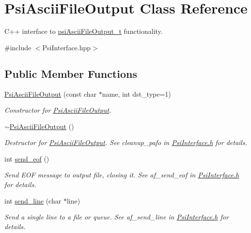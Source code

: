 \hypertarget{classPsiAsciiFileOutput}{}\section{Psi\+Ascii\+File\+Output Class Reference}
\label{classPsiAsciiFileOutput}


C++ interface to \hyperlink{structpsiAsciiFileOutput__t}{psi\+Ascii\+File\+Output\+\_\+t} functionality.  




{\ttfamily \#include $<$Psi\+Interface.\+hpp$>$}

\subsection*{Public Member Functions}
\begin{DoxyCompactItemize}
\item 
\hyperlink{classPsiAsciiFileOutput_a08f5ec347f018509dcdd6b7405e15e36}{Psi\+Ascii\+File\+Output} (const char $\ast$name, int dst\+\_\+type=1)
\begin{DoxyCompactList}\small\item\em Constructor for \hyperlink{classPsiAsciiFileOutput}{Psi\+Ascii\+File\+Output}. \end{DoxyCompactList}\item 
\mbox{\label{classPsiAsciiFileOutput_a616fa02af7a51f36d62e2aa109035072}} 
\hyperlink{classPsiAsciiFileOutput_a616fa02af7a51f36d62e2aa109035072}{$\sim$\+Psi\+Ascii\+File\+Output} ()
\begin{DoxyCompactList}\small\item\em Destructor for \hyperlink{classPsiAsciiFileOutput}{Psi\+Ascii\+File\+Output}. See cleanup\+\_\+pafo in \hyperlink{PsiInterface_8h_source}{Psi\+Interface.\+h} for details. \end{DoxyCompactList}\item 
int \hyperlink{classPsiAsciiFileOutput_a9173658e711537902ea50bf8c3b5b292}{send\+\_\+eof} ()
\begin{DoxyCompactList}\small\item\em Send E\+OF message to output file, closing it. See af\+\_\+send\+\_\+eof in \hyperlink{PsiInterface_8h_source}{Psi\+Interface.\+h} for details. \end{DoxyCompactList}\item 
int \hyperlink{classPsiAsciiFileOutput_ad90b9b03bdf05f14be85fe0735df60a9}{send\+\_\+line} (char $\ast$line)
\begin{DoxyCompactList}\small\item\em Send a single line to a file or queue. See af\+\_\+send\+\_\+line in \hyperlink{PsiInterface_8h_source}{Psi\+Interface.\+h} for details. \end{DoxyCompactList}\end{DoxyCompactItemize}


